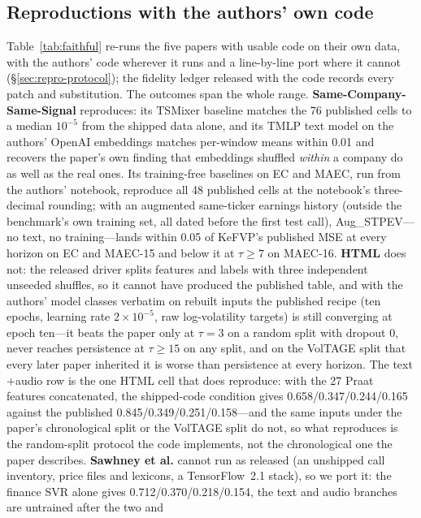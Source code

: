 \subsection{Reproductions with the authors' own code}
\label{sec:results-faithful}
Table~\ref{tab:faithful} re-runs the five papers with usable code on their own data,
with the authors' code wherever it runs and a line-by-line port where it cannot
(\S\ref{sec:repro-protocol}); the fidelity ledger released with the code records every
patch and substitution. The outcomes span the whole range. \textbf{Same-Company-Same-Signal}
reproduces: its TSMixer baseline matches the 76 published cells to a median $10^{-5}$
from the shipped data alone, and its TMLP text model on the authors' OpenAI embeddings
matches per-window means within 0.01 and recovers the paper's own finding that
embeddings shuffled \emph{within} a company do as well as the real ones. Its
training-free baselines on EC and MAEC, run from the authors' notebook, reproduce all
48 published cells at the notebook's three-decimal rounding; with an augmented
same-ticker earnings history (outside the benchmark's own training set, all dated
before the first test call), Aug\_STPEV---no text, no training---lands within 0.05 of
KeFVP's published MSE at every horizon on EC and MAEC-15 and below it at
$\tau\ge 7$ on MAEC-16. \textbf{HTML}
does not: the released driver splits features and labels with three independent
unseeded shuffles, so it cannot have produced the published table, and with the
authors' model classes verbatim on rebuilt inputs the published recipe (ten epochs,
learning rate $2{\times}10^{-5}$, raw log-volatility targets) is still converging at
epoch ten---it beats the paper only at $\tau{=}3$ on a random split with dropout 0,
never reaches persistence at $\tau\ge 15$ on any split, and on the VolTAGE split that
every later paper inherited it is worse than persistence at every horizon. The
text$+$audio row is the one HTML cell that does reproduce: with the 27 Praat
features concatenated, the shipped-code condition gives 0.658/0.347/0.244/0.165
against the published 0.845/0.349/0.251/0.158---and the same inputs under the
paper's chronological split or the VolTAGE split do not, so what reproduces is the
random-split protocol the code implements, not the chronological one the paper
describes.
\textbf{Sawhney et al.} cannot run as released (an unshipped call inventory, price files
and lexicons, a TensorFlow~2.1 stack), so we port it: the finance SVR alone gives
0.712/0.370/0.218/0.154, the text and audio branches are untrained after the two and
